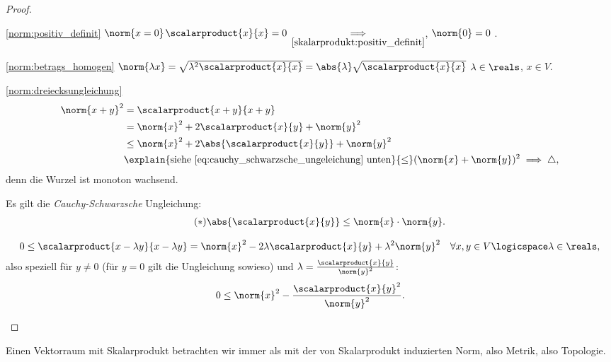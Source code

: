 \begin{proof}
    \begin{proofdescription}
        \item[\ref{norm:positiv_definit}] \( \norm{x=0}  \)\timplies \( \scalarproduct{x}{x}=0 \) \( \underset{\ref{skalarprodukt:positiv_definit}}{\implies} \), \( \norm{0}=0 \) \checkmark.
        \item[\ref{norm:betrags_homogen}] \( \norm{\lambda x}=\sqrt{\lambda^2\scalarproduct{x}{x}}=\abs{\lambda}\sqrt{\scalarproduct{x}{x}} \) \tforall \( \lambda\in \reals \), \( x\in V \).
        \item[\ref{norm:dreiecksungleichung}] 
        \begin{align*}
            \norm{x+y}^2 \begin{aligned}[t]
                &=\scalarproduct{x+y}{x+y}\\
                &=\norm{x}^2+2\scalarproduct{x}{y}+\norm{y}^2\\
                &\leq \norm{x}^2+2\abs{\scalarproduct{x}{y}}+\norm{y}^2\\
                &\explain{\text{siehe \eqref{eq:cauchy_schwarzsche_ungeleichung} unten}}{\leq} (\norm{x}+\norm{y})^2\implies \triangle,
            \end{aligned}            
        \end{align*}
        denn die Wurzel ist monoton wachsend.

        Es gilt die \emph{Cauchy-Schwarzsche} Ungleichung:
        \begin{align*}
            \tag{\(*\)}\label{eq:cauchy_schwarzsche_ungeleichung} \abs{\scalarproduct{x}{y}}\leq \norm{x}\cdot \norm{y}.
        \end{align*}
        \begin{subproof}
            \begin{align*}
                0\leq \scalarproduct{x-\lambda y}{x-\lambda y}=\norm{x}^2-2\lambda \scalarproduct{x}{y}+\lambda^2 \norm{y}^2\quad \forall x,y\in V\logicspace \lambda\in\reals,
            \end{align*}
            also speziell für \( y\neq 0 \) (für \( y=0 \) gilt die Ungleichung sowieso) und \( \lambda=\frac{\scalarproduct{x}{y}}{\norm{y}^2} \):
            \begin{align*}
                0\leq \norm{x}^2-\frac{\scalarproduct{x}{y}^2}{\norm{y}^2}.
            \end{align*}
        \end{subproof}
    \end{proofdescription}
\end{proof}
Einen Vektorraum mit Skalarprodukt betrachten wir immer als mit der von Skalarprodukt induzierten Norm, also Metrik, also Topologie.

